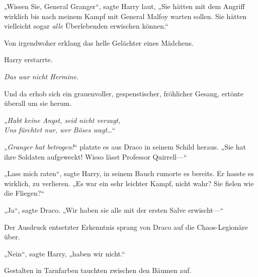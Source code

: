 „Wissen Sie, General Granger“, sagte Harry laut,
„Sie hätten mit dem Angriff wirklich bis nach meinem Kampf mit General Malfoy warten sollen. Sie hätten vielleicht sogar \emph{alle} Überlebenden erwischen können.“

Von irgendwoher erklang das helle Gelächter eines Mädchens.

Harry erstarrte.

\emph{Das war nicht Hermine.}

Und da erhob sich ein grauenvoller, gespenstischer, fröhlicher Gesang, ertönte überall um sie herum.

„\emph{Habt keine Angst, seid nicht verzagt,\\
Uns fürchtet nur, wer Böses wagt…}“

„\emph{Granger hat betrogen!}“ platzte es aus Draco in seinem Schild heraus.
„Sie hat ihre Soldaten aufgeweckt! Wieso lässt Professor Quirrell—“

„Lass mich raten“, sagte Harry, in seinem Bauch rumorte es bereits. Er hasste es wirklich, zu verlieren.
„Es war ein sehr leichter Kampf, nicht wahr? Sie fielen wie die Fliegen?“

„Ja“, sagte Draco.
„Wir haben sie alle mit der ersten Salve erwischt—“

Der Ausdruck entsetzter Erkenntnis sprang von Draco auf die Chaos-Legionäre über.

„Nein“, sagte Harry, „haben wir nicht.“

Gestalten in Tarnfarben tauchten zwischen den Bäumen auf.

